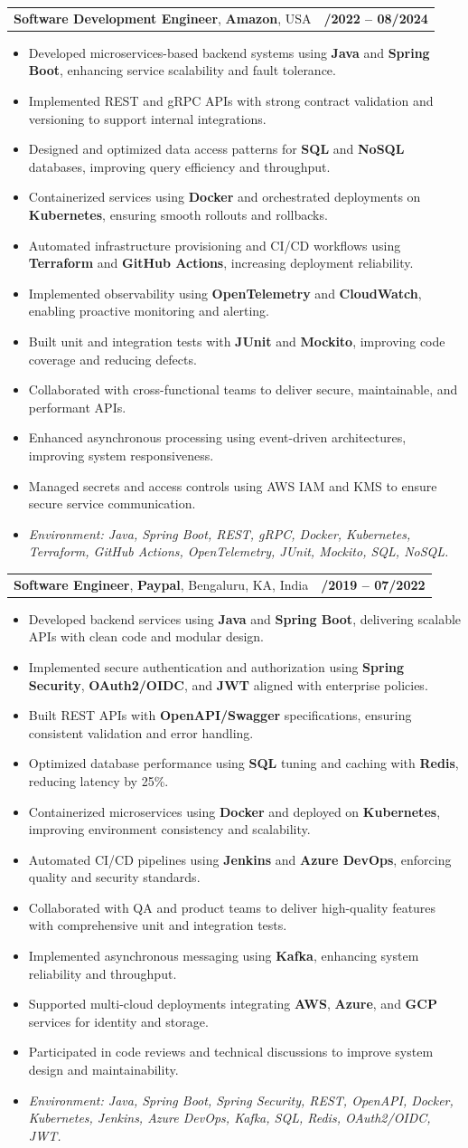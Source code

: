 \documentclass[letterpaper,11pt]{article}
\makeatletter
\newcommand{\resumeItem}[1]{
  \item\footnotesize{
    {#1 \vspace{-2pt}}
  }
}
\newcommand{\resumeSubheading}[4]{
  \vspace{-2pt}\item
    \begin{tabular*}{1.0\textwidth}[t]{l@{\extracolsep{\fill}}r}
      \textbf{\fontsize{10pt}{14pt}\selectfont #3}, \textbf{\fontsize{10pt}{14pt}\selectfont #1}, \fontsize{10pt}{14pt}\selectfont #4 & \textbf{\fontsize{10pt}{14pt}\selectfont #2} \\
    \end{tabular*}\vspace{-7pt}
}
\newcommand{\resumeItemListStart}{\begin{itemize}[leftmargin=*]}
\newcommand{\resumeItemListEnd}{\end{itemize}\vspace{-5pt}}
\makeatother
\begin{document}
\resumeSubheading
{Amazon}{10/2022 -- 08/2024}
{Software Development Engineer}{USA}
\resumeItemListStart
  \resumeItem{Developed microservices-based backend systems using \textbf{Java} and \textbf{Spring Boot}, enhancing service scalability and fault tolerance.}
  \resumeItem{Implemented REST and gRPC APIs with strong contract validation and versioning to support internal integrations.}
  \resumeItem{Designed and optimized data access patterns for \textbf{SQL} and \textbf{NoSQL} databases, improving query efficiency and throughput.}
  \resumeItem{Containerized services using \textbf{Docker} and orchestrated deployments on \textbf{Kubernetes}, ensuring smooth rollouts and rollbacks.}
  \resumeItem{Automated infrastructure provisioning and CI/CD workflows using \textbf{Terraform} and \textbf{GitHub Actions}, increasing deployment reliability.}
  \resumeItem{Implemented observability using \textbf{OpenTelemetry} and \textbf{CloudWatch}, enabling proactive monitoring and alerting.}
  \resumeItem{Built unit and integration tests with \textbf{JUnit} and \textbf{Mockito}, improving code coverage and reducing defects.}
  \resumeItem{Collaborated with cross-functional teams to deliver secure, maintainable, and performant APIs.}
  \resumeItem{Enhanced asynchronous processing using event-driven architectures, improving system responsiveness.}
  \resumeItem{Managed secrets and access controls using AWS IAM and KMS to ensure secure service communication.}
  \resumeItem{\textit{Environment: Java, Spring Boot, REST, gRPC, Docker, Kubernetes, Terraform, GitHub Actions, OpenTelemetry, JUnit, Mockito, SQL, NoSQL.}}
\resumeItemListEnd

\resumeSubheading
{Paypal}{08/2019 -- 07/2022}
{Software Engineer}{Bengaluru, KA, India}
\resumeItemListStart
  \resumeItem{Developed backend services using \textbf{Java} and \textbf{Spring Boot}, delivering scalable APIs with clean code and modular design.}
  \resumeItem{Implemented secure authentication and authorization using \textbf{Spring Security}, \textbf{OAuth2/OIDC}, and \textbf{JWT} aligned with enterprise policies.}
  \resumeItem{Built REST APIs with \textbf{OpenAPI/Swagger} specifications, ensuring consistent validation and error handling.}
  \resumeItem{Optimized database performance using \textbf{SQL} tuning and caching with \textbf{Redis}, reducing latency by 25\%.}
  \resumeItem{Containerized microservices using \textbf{Docker} and deployed on \textbf{Kubernetes}, improving environment consistency and scalability.}
  \resumeItem{Automated CI/CD pipelines using \textbf{Jenkins} and \textbf{Azure DevOps}, enforcing quality and security standards.}
  \resumeItem{Collaborated with QA and product teams to deliver high-quality features with comprehensive unit and integration tests.}
  \resumeItem{Implemented asynchronous messaging using \textbf{Kafka}, enhancing system reliability and throughput.}
  \resumeItem{Supported multi-cloud deployments integrating \textbf{AWS}, \textbf{Azure}, and \textbf{GCP} services for identity and storage.}
  \resumeItem{Participated in code reviews and technical discussions to improve system design and maintainability.}
  \resumeItem{\textit{Environment: Java, Spring Boot, Spring Security, REST, OpenAPI, Docker, Kubernetes, Jenkins, Azure DevOps, Kafka, SQL, Redis, OAuth2/OIDC, JWT.}}
\resumeItemListEnd
\end{document}
